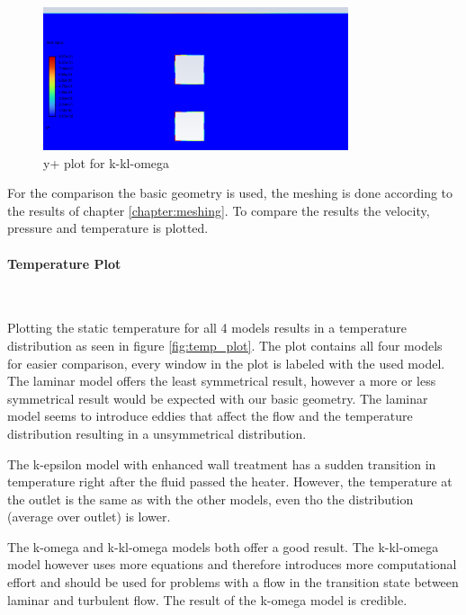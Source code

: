 \begin{figure}[htbp]   
    \centering
    \includegraphics[width=0.8\textwidth]{img/y_plus_k_kl_omega_detail_inf5.png}
    \caption{y+ plot for k-kl-omega}
    \label{fig:k_kl_omega_y_plus}
\end{figure}

For the comparison the basic geometry is used, the meshing is done according to the results of chapter \ref{chapter:meshing}.
To compare the results the velocity, pressure and temperature is plotted.

\paragraph{Temperature Plot}~

Plotting the static temperature for all 4 models results in a temperature distribution as seen in figure \ref{fig:temp_plot}.
The plot contains all four models for easier comparison, every window in the plot is labeled with the used model. 
The laminar model offers the least symmetrical result, however a more or less symmetrical result would be expected with our basic geometry.
The laminar model seems to introduce eddies that affect the flow and the temperature distribution resulting in a unsymmetrical distribution.

The k-epsilon model with enhanced wall treatment has a sudden transition in temperature right after the fluid passed the heater. However, the temperature at the outlet is the same as with the other models, even tho the distribution (average over outlet) is lower.

The k-omega and k-kl-omega models both offer a good result. The k-kl-omega model however uses more equations and therefore introduces more computational effort and should be used for problems with a flow in the transition state between laminar and turbulent flow.
The result of the k-omega model is credible.

